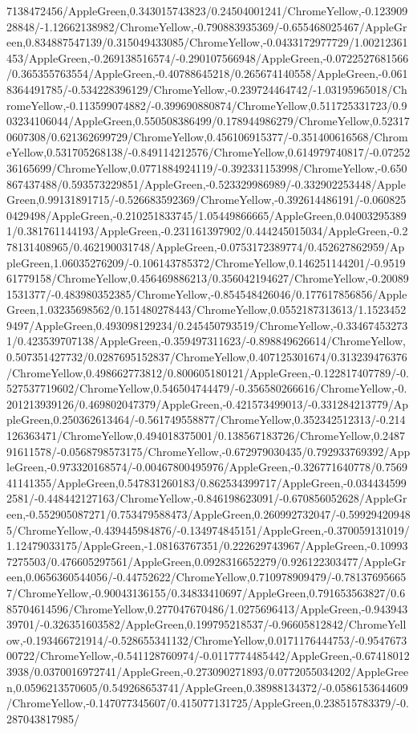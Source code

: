 {\begin{tikzternal}
7138472456/AppleGreen,0.343015743823/0.24504001241/ChromeYellow,-0.12390928848/-1.12662138982/ChromeYellow,-0.790883935369/-0.655468025467/AppleGreen,0.834887547139/0.315049433085/ChromeYellow,-0.0433172977729/1.00212361453/AppleGreen,-0.269138516574/-0.290107566948/AppleGreen,-0.0722527681566/0.365355763554/AppleGreen,-0.40788645218/0.265674140558/AppleGreen,-0.0618364491785/-0.534228396129/ChromeYellow,-0.239724464742/-1.03195965018/ChromeYellow,-0.113599074882/-0.399690880874/ChromeYellow,0.511725331723/0.903234106044/AppleGreen,0.550508386499/0.178944986279/ChromeYellow,0.523170607308/0.621362699729/ChromeYellow,0.456106915377/-0.351400616568/ChromeYellow,0.531705268138/-0.849114212576/ChromeYellow,0.614979740817/-0.0725236165699/ChromeYellow,0.0771884924119/-0.392331153998/ChromeYellow,-0.650867437488/0.593573229851/AppleGreen,-0.523329986989/-0.332902253448/AppleGreen,0.99131891715/-0.526683592369/ChromeYellow,-0.392614486191/-0.0608250429498/AppleGreen,-0.210251833745/1.05449866665/AppleGreen,0.040032953891/0.381761144193/AppleGreen,-0.231161397902/0.444245015034/AppleGreen,-0.278131408965/0.462190031748/AppleGreen,-0.0753172389774/0.452627862959/AppleGreen,1.06035276209/-0.106143785372/ChromeYellow,0.146251144201/-0.951961779158/ChromeYellow,0.456469886213/0.356042194627/ChromeYellow,-0.200891531377/-0.483980352385/ChromeYellow,-0.854548426046/0.177617856856/AppleGreen,1.03235698562/0.151480278443/ChromeYellow,0.0552187313613/1.15234529497/AppleGreen,0.493098129234/0.245450793519/ChromeYellow,-0.334674532731/0.423539707138/AppleGreen,-0.359497311623/-0.898849626614/ChromeYellow,0.507351427732/0.0287695152837/ChromeYellow,0.407125301674/0.313239476376/ChromeYellow,0.498662773812/0.800605180121/AppleGreen,-0.122817407789/-0.527537719602/ChromeYellow,0.546504744479/-0.356580266616/ChromeYellow,-0.201213939126/0.469802047379/AppleGreen,-0.421573499013/-0.331284213779/AppleGreen,0.250362613464/-0.561749558877/ChromeYellow,0.352342512313/-0.214126363471/ChromeYellow,0.494018375001/0.138567183726/ChromeYellow,0.248791611578/-0.0568798573175/ChromeYellow,-0.672979030435/0.792933769392/AppleGreen,-0.973320168574/-0.00467800495976/AppleGreen,-0.326771640778/0.756941141355/AppleGreen,0.547831260183/0.862534399717/AppleGreen,-0.0344345992581/-0.448442127163/ChromeYellow,-0.846198623091/-0.670856052628/AppleGreen,-0.552905087271/0.753479588473/AppleGreen,0.260992732047/-0.599294209485/ChromeYellow,-0.439445984876/-0.134974845151/AppleGreen,-0.370059131019/1.12479033175/AppleGreen,-1.08163767351/0.222629743967/AppleGreen,-0.109937275503/0.476605297561/AppleGreen,0.0928316652279/0.926122303477/AppleGreen,0.0656360544056/-0.44752622/ChromeYellow,0.710978909479/-0.781376956657/ChromeYellow,-0.90043136155/0.34833410697/AppleGreen,0.791653563827/0.685704614596/ChromeYellow,0.277047670486/1.0275696413/AppleGreen,-0.94394339701/-0.326351603582/AppleGreen,0.199795218537/-0.96605812842/ChromeYellow,-0.193466721914/-0.528655341132/ChromeYellow,0.0171176444753/-0.954767300722/ChromeYellow,-0.541128760974/-0.0117774485442/AppleGreen,-0.674180123938/0.0370016972741/AppleGreen,-0.273090271893/0.0772055034202/AppleGreen,0.0596213570605/0.549268653741/AppleGreen,0.38988134372/-0.0586153644609/ChromeYellow,-0.147077345607/0.415077131725/AppleGreen,0.238515783379/-0.287043817985/
\end{tikzternal}}
